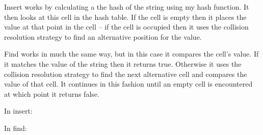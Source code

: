 \documentclass[a4]{article}
\newif\ifc
\newif\ifjava
\newif\ifpython
\begin{document}
Insert works by calculating a the hash of the string using my hash function.  It then looks at this cell in the hash table.  If the cell is empty then it places the value at that point in the cell -- if the cell is occupied then it uses the collision resolution strategy to find an alternative position for the value.

Find works in much the same way, but in this case it compares the cell's value.  If it matches the value of the string then it returns true.  Otherwise it uses the collision resolution strategy to find the next alternative cell and compares the value of that cell.  It continues in this fashion until an empty cell is encountered at which point it returns false.


In insert:
\ifc
\begin{verbatim}
	for(int j = 1; j < N; j++){
            int look = (pos + j) % N;
            set->collision ++;
            if(set->cells[look].state != in_use){
              insertCell(value, set, look);
              break;
            }
\end{verbatim}
\fi

\ifjava
\begin{verbatim}
if(isLinearProbing(mode)) // linear probing: A[(i+j)mod N]
   {
       for(int j = 1; j < N; j++){
            int look = (pos + j) % N;
            collision ++;
            if(cells[look].state != state.in_use){
                 insertCell(value, look);
                 break;
            }
      }
}
\end{verbatim}
\fi

\ifpython
\begin{verbatim}
if self.isLinearProbing(self.mode): # linear probing: A[(i + j)mod N]
    for j in range(1, N):
         look = (pos + j) % N
         self.collision = self.collision + 1
         if (self.cells[look].state != state.in_use):
                 self.insertCell(value, look)
                 break
         if (self.cells[look].element == value):
                 break
\end{verbatim}
\fi



In find:
\ifc
\begin{verbatim}
for(int j = 1; j < N; j++){
          int look = (pos + j) % N;
          if(set->cells[look].state == empty)
            return false;
          if(set->cells[look].state == in_use
             && (strcmp(set->cells[look].element, value) == 0)){
            return true;
          }
        }
\end{verbatim}
\fi
\end{document}
